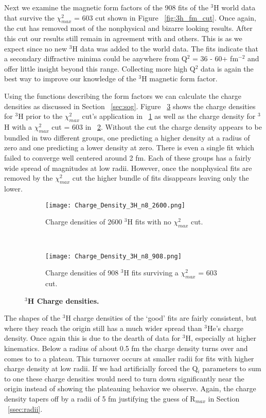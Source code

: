 Next we examine the magnetic form factors of the 908 fits of the $^3$H world data that survive the $\chi^2_{max}$ = 603 cut shown in Figure ~\ref{fig:3h_fm_cut}. Once again, the cut has removed most of the nonphysical and bizarre looking results. After this cut our results still remain in agreement with \cite{Article:Amroun} and others. This is as we expect since no new $^3$H data was added to the world data. The fits indicate that a secondary diffractive minima could be anywhere from Q$^2$ = 36 - 60+ fm$^{-2}$ and offer little insight beyond this range. Collecting more high Q$^2$ data is again the best way to improve our knowledge of the $^3$H magnetic form factor.

Using the functions describing the form factors we can calculate the charge densities as discussed in Section ~\ref{sec:sog}. Figure ~\ref{fig:3h_charge_density} shows the charge densities for $^3$H prior to the $\chi^2_{max}$ cut's application in ~\ref{fig:3h_charge_density_no_cut} as well as the charge density for $^3$H with a $\chi^2_{max}$ cut = 603 in ~\ref{fig:3h_charge_density_cut}. Without the cut the charge density appears to be bundled in two different groups, one predicting a higher density at a radius of zero and one predicting a lower density at zero. There is even a single fit which failed to converge well centered around 2 fm. Each of these groups has a fairly wide spread of magnitudes at low radii. However, once the nonphysical fits are removed by the $\chi^2_{max}$ cut the higher bundle of fits disappears leaving only the lower. 

\begin{figure}[!ht]
\begin{subfigure}{1.\textwidth}
  \centering
  \texttt{[image: Charge\_Density\_3H\_n8\_2600.png]}
  \caption{Charge densities of 2600 $^3$H fits with no $\chi^2_{max}$ cut.}
  \label{fig:3h_charge_density_no_cut}
\end{subfigure}\\
\begin{subfigure}{1.\textwidth}
  \centering
  \texttt{[image: Charge\_Density\_3H\_n8\_908.png]}
  \caption{Charge densities of 908 $^3$H fits surviving a $\chi^2_{max}$ = 603 cut.}
  \label{fig:3h_charge_density_cut}
\end{subfigure}
\caption{\bf{$^3$H Charge densities.}}
\label{fig:3h_charge_density}
\end{figure}

The shapes of the $^3$H charge densities of the `good' fits are fairly consistent, but where they reach the origin still has a much wider spread than $^3$He's charge density. Once again this is due to the dearth of data for $^3$H, especially at higher kinematics. Below a radius of about 0.5 fm the charge density turns over and comes to to a plateau. This turnover occurs at smaller radii for fits with higher charge density at low radii. If we had artificially forced the Q$_i$ parameters to sum to one these charge densities would need to turn down significantly near the origin instead of showing the plateauing behavior we observe. Again, the charge density tapers off by a radii of 5 fm justifying the guess of R$_{max}$ in Section ~\ref{ssec:radii}.